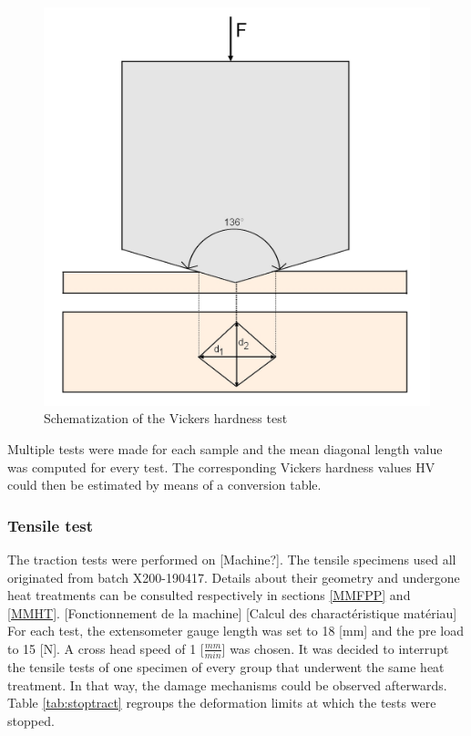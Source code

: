 \begin{figure}[th]
\centering
\centerline{\includegraphics[scale=0.29]{Images/Vickers}}
\decoRule
\caption[Schematization of the Vickers hardness test]{Schematization of the Vickers hardness test}
\label{fig:Vick}
\end{figure}

Multiple tests were made for each sample and the mean diagonal length value was computed for every test. The corresponding Vickers hardness values HV could then be estimated by means of a conversion table.\\

\subsubsection{Tensile test}

The traction tests were performed on [Machine?]. The tensile specimens used all originated from batch X200-190417. Details about their geometry and undergone heat treatments can be consulted respectively in sections \ref{MMFPP} and \ref{MMHT}. [Fonctionnement de la machine] [Calcul des charactéristique matériau] \\

For each test, the extensometer gauge length was set to 18 [mm] and the pre load to 15 [N]. A cross head speed of 1 [$\frac{mm}{min}$] was chosen. It was decided to interrupt the tensile tests of one specimen of every group that underwent the same heat treatment. In that way, the damage mechanisms could be observed afterwards. Table \ref{tab:stoptract} regroups the deformation limits at which the tests were stopped.\\

